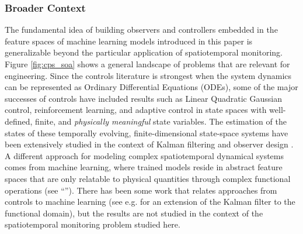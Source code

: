 \subsubsection*{Broader Context}
The fundamental idea of building observers and controllers embedded in the feature spaces of machine learning models introduced in this paper is generalizable beyond the particular application of spatiotemporal monitoring. Figure \ref{fig:cps_soa} shows a general landscape of problems that are relevant for engineering. Since the controls literature is strongest when the system dynamics can be represented as Ordinary Differential Equations (ODEs), some of the major successes of controls have included results such as Linear Quadratic Gaussian control, reinforcement learning, and adaptive control in state spaces with well-defined, finite, and \emph{physically meaningful} state variables. The estimation of the states of these temporally evolving, finite-dimensional state-space systems have been extensively studied in the context of Kalman filtering and observer design \cite{Gelb74}. A different approach for modeling complex spatiotemporal dynamical systems comes from machine learning, where trained models reside in abstract feature spaces that are only relatable to physical quantities through complex functional operations (see ``''). There has been some work that relates approaches from controls to machine learning (see e.g. \cite{mardia1998kriged} for an extension of the Kalman filter to the functional domain), but the results are not studied in the context of the spatiotemporal monitoring problem studied here. 

